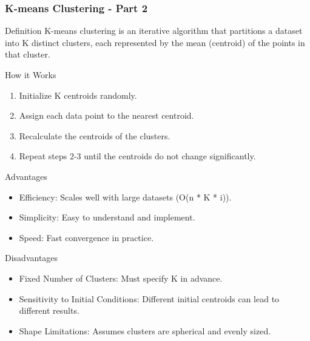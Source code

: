 \documentclass[aspectratio=169]{beamer}
\begin{document}
\begin{frame}[fragile]
    \frametitle{K-means Clustering - Part 2}
    \begin{block}{Definition}
        K-means clustering is an iterative algorithm that partitions a dataset into K distinct clusters, each represented by the mean (centroid) of the points in that cluster.
    \end{block}
    
    \begin{block}{How it Works}
        \begin{enumerate}
            \item Initialize K centroids randomly.
            \item Assign each data point to the nearest centroid.
            \item Recalculate the centroids of the clusters.
            \item Repeat steps 2-3 until the centroids do not change significantly.
        \end{enumerate}
    \end{block}
    
    \begin{block}{Advantages}
        \begin{itemize}
            \item Efficiency: Scales well with large datasets (O(n * K * i)).
            \item Simplicity: Easy to understand and implement.
            \item Speed: Fast convergence in practice.
        \end{itemize}
    \end{block}
    
    \begin{block}{Disadvantages}
        \begin{itemize}
            \item Fixed Number of Clusters: Must specify K in advance.
            \item Sensitivity to Initial Conditions: Different initial centroids can lead to different results.
            \item Shape Limitations: Assumes clusters are spherical and evenly sized.
        \end{itemize}
    \end{block}
\end{frame}
\end{document}
